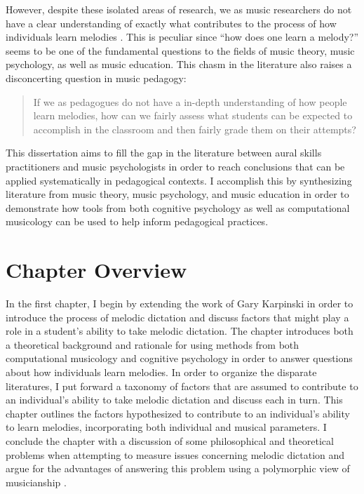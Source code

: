 \documentclass[12pt,]{book}
\begin{document}
However, despite these isolated areas of research, we as music researchers do not have a clear understanding of exactly what contributes to the process of how individuals learn melodies \citep{halpernMemoryMelodies2010}.
This is peculiar since ``how does one learn a melody?'' seems to be one of the fundamental questions to the fields of music theory, music psychology, as well as music education.
This chasm in the literature also raises a disconcerting question in music pedagogy:

\begin{quote}
If we as pedagogues do not have a in-depth understanding of how people learn melodies, how can we fairly assess what students can be expected to accomplish in the classroom and then fairly grade them on their attempts?
\end{quote}

This dissertation aims to fill the gap in the literature between aural skills practitioners and music psychologists in order to reach conclusions that can be applied systematically in pedagogical contexts.
I accomplish this by synthesizing literature from music theory, music psychology, and music education in order to demonstrate how tools from both cognitive psychology as well as computational musicology can be used to help inform pedagogical practices.

\hypertarget{chapter-overview}{%
\section{Chapter Overview}\label{chapter-overview}}

In the first chapter, I begin by extending the work of Gary Karpinski \citep{karpinskiAuralSkillsAcquisition2000, karpinskiModelMusicPerception1990} in order to introduce the process of melodic dictation and discuss factors that might play a role in a student's ability to take melodic dictation.
The chapter introduces both a theoretical background and rationale for using methods from both computational musicology and cognitive psychology in order to answer questions about how individuals learn melodies.
In order to organize the disparate literatures, I put forward a taxonomy of factors that are assumed to contribute to an individual's ability to take melodic dictation and discuss each in turn.
This chapter outlines the factors hypothesized to contribute to an individual's ability to learn melodies, incorporating both individual and musical parameters.
I conclude the chapter with a discussion of some philosophical and theoretical problems when attempting to measure issues concerning melodic dictation and argue for the advantages of answering this problem using a polymorphic view of musicianship \citep{levitinWhatDoesIt2012, peretzNatureMusicBiological2006, bakerExaminingMusicalSophistication2018a}.
\end{document}
